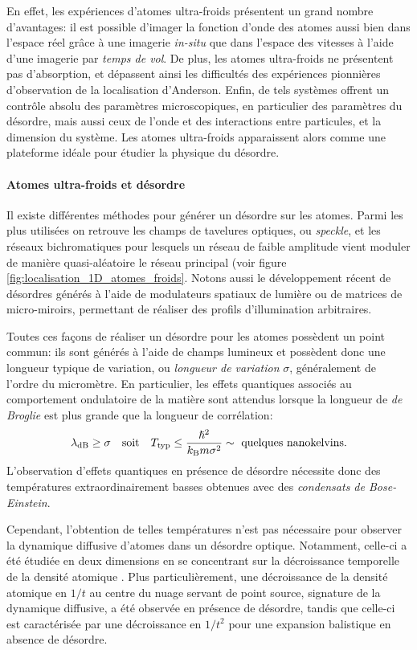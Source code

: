En effet, les expériences d'atomes ultra-froids présentent un grand nombre d'avantages: il est possible d'imager la fonction d'onde des atomes aussi bien dans l'espace réel grâce à une imagerie \emph{in-situ} que dans l'espace des vitesses à l'aide d'une imagerie par \emph{temps de vol}. De plus, les atomes ultra-froids ne présentent pas d'absorption, et dépassent ainsi les difficultés des expériences pionnières d'observation de la localisation d'Anderson. Enfin, de tels systèmes offrent un contrôle absolu des paramètres microscopiques, en particulier des paramètres du désordre, mais aussi ceux de l'onde et des interactions entre particules, et la dimension du système. Les atomes ultra-froids apparaissent alors comme une plateforme idéale pour étudier la physique du désordre.


\paragraph*{Atomes ultra-froids et désordre}
Il existe différentes méthodes pour générer un désordre sur les atomes. Parmi les plus utilisées on retrouve les champs de tavelures optiques, ou \emph{speckle}, et les réseaux bichromatiques pour lesquels un réseau de faible amplitude vient moduler de manière quasi-aléatoire le réseau principal (voir figure \ref{fig:localisation_1D_atomes_froids}. Notons aussi le développement récent de désordres générés à l'aide de modulateurs spatiaux de lumière ou de matrices de micro-miroirs, permettant de réaliser des profils d'illumination arbitraires.

Toutes ces façons de réaliser un désordre pour les atomes possèdent un point commun: ils sont générés à l'aide de champs lumineux et possèdent donc une longueur typique de variation, ou \emph{longueur de variation} $\sigma$, généralement de l'ordre du micromètre. En particulier, les effets quantiques associés au comportement ondulatoire de la matière sont attendus lorsque la longueur de \emph{de Broglie} est plus grande que la longueur de corrélation:
\begin{equation}
\lambda_{\mathrm{dB}}\geq\sigma \quad \text{soit} \quad T_{\mathrm{typ}} \leq \frac{\hslash^2}{ k_{\mathrm{B}} m \sigma^2}\sim \text{ quelques nanokelvins.}
\end{equation}
L'observation d'effets quantiques en présence de désordre nécessite donc des températures extraordinairement basses obtenues avec des \emph{condensats de Bose-Einstein}. 

Cependant, l'obtention de telles températures n'est pas nécessaire pour observer la dynamique diffusive d'atomes dans un désordre optique. Notamment, celle-ci a été étudiée en deux dimensions en se concentrant sur la décroissance temporelle de la densité atomique \citep{robert2010anisotropic}. Plus particulièrement, une décroissance de la densité atomique en $1/t$ au centre du nuage servant de point source, signature de la dynamique diffusive, a été observée en présence de désordre, tandis que celle-ci est caractérisée par une décroissance en $1/t^2$ pour une expansion balistique en absence de désordre.



